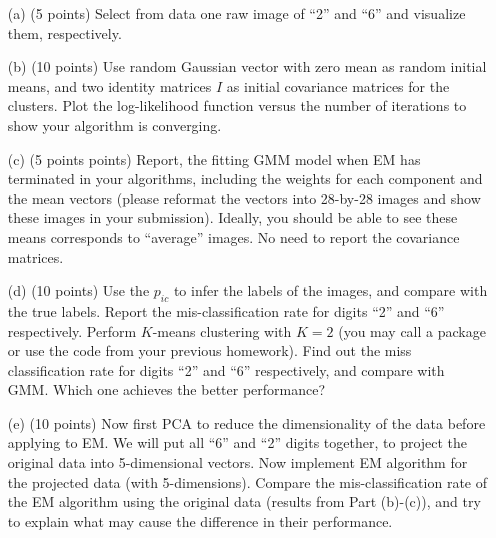 \documentclass[twoside,12pt]{article}
\begin{document}
\begin{enumerate}

\item[(a)] (5 points) Select from data one raw image of ``2'' and ``6'' and visualize them, respectively. 

\item[(b)] (10 points) Use random Gaussian vector with zero mean as random initial means, and two identity matrices $I$ as initial covariance matrices for the clusters. Plot the log-likelihood function versus the number of iterations to show your algorithm is converging.

\item[(c)] (5 points points) Report, the fitting GMM model when EM has terminated in your algorithms, including the weights for each component and the mean vectors (please reformat the vectors into 28-by-28 images and show these images in your submission). Ideally, you should be able to see these means corresponds to ``average'' images.  No need to report the covariance matrices. 

\item[(d)] (10 points) Use the $p_{ic}$ to infer the labels of the images, and compare with the true labels. Report the mis-classification rate for digits ``2'' and ``6'' respectively. Perform $K$-means clustering with $K=2$ (you may call a package or use the code from your previous homework). Find out the  miss classification rate for digits ``2'' and ``6'' respectively, and compare with GMM. Which one achieves the better performance?

\item[(e)] (10 points) Now first PCA to reduce the dimensionality of the data before applying to EM. We will put all ``6'' and ``2'' digits together, to project the original data into 5-dimensional vectors. Now implement EM algorithm for the projected data (with 5-dimensions). Compare the mis-classification rate of the EM algorithm using the original data (results from Part (b)-(c)), and try to explain what may cause the difference in their performance. 


\end{enumerate}
\end{document}
